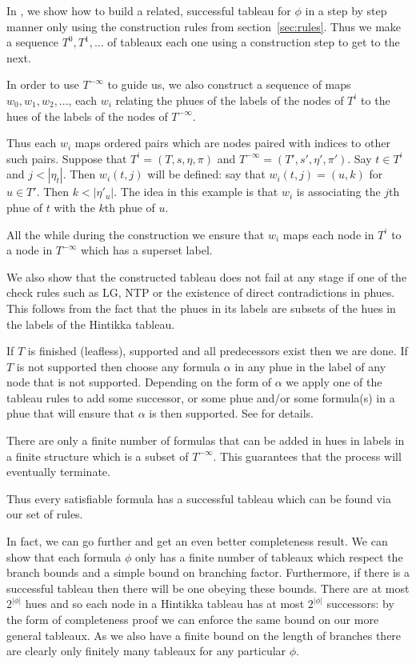 \documentclass[submission,copyright,creativecommons]{eptcs}
\begin{document}
In \cite{Rey:fasttablong}, we show how to build a related, successful tableau
for $\phi$
in a step by step manner
only using the 
construction rules from section~\ref{sec:rules}.
Thus we make a sequence
$T^0, T^1, ...$ of tableaux 
each one using a construction step to get to the next.

In order to use $T^{- \infty}$ to guide us,
we also construct
a sequence of maps
$w_0, w_1, w_2, ...$,
each $w_i$ relating the 
phues of the labels of the nodes of $T^i$ to the hues of the 
labels of the nodes
of $T^{- \infty}$.

Thus each $w_i$ maps ordered pairs which are
nodes paired with indices
to other such pairs.
Suppose that $T^i=(T,s,\eta,\pi)$
and $T^{-\infty}=(T',s',\eta',\pi')$.
Say $t \in T^i$ and 
$j < |\eta_t|$.
Then $w_i(t,j)$ will be defined: say that
$w_i(t,j)=(u,k)$ for $u \in T'$.
Then $k<|\eta'_u|$.
The idea in this example is that $w_i$ is associating the $j$th phue
of $t$ with the $k$th phue of $u$.

All the while during the
construction
we ensure that 
 $w_i$ maps 
each node in $T^i$ to a node in $T^{-\infty}$
which has a superset label.

We also show that the constructed tableau 
does not fail at any stage if one of the check rules
such as LG, NTP or the
existence of direct contradictions in phues.
This follows from the fact that the
phues in its labels are subsets 
of the hues in the
labels of the Hintikka tableau.

If $T$ is finished (leafless), supported and 
all predecessors exist then we are done.
If $T$ is not supported then choose any
formula $\alpha$ in any phue in the label
of any node that is not supported.
Depending on the form of $\alpha$
we apply one of the tableau rules
to add some successor,
or some phue
and/or some formula(s)
in a phue that will ensure that
$\alpha$ is then supported.
See \cite{Rey:fasttablong} for details.

There are only a finite number of 
formulas that can be added in hues in labels in a finite structure which is a subset of 
$T^{-\infty}$.
This guarantees
that the process will eventually terminate.

Thus every satisfiable formula
has a successful tableau
which can be found via our set
of rules.

In fact, we can go further and get an
even better completeness result.
We can show that each formula
$\phi$ only has a
finite number of tableaux
which respect the branch bounds
and a simple bound on branching factor.
Furthermore, if there is a successful
tableau then there will be one
obeying these bounds.
There are at most $2^{|\phi|}$ hues
and so each node
in a Hintikka tableau has at most
$2^{|\phi|}$ successors:
by the form of completeness proof we can
enforce the same bound on our
more general tableaux.
As we also have a finite bound on the length
of branches
there are clearly only finitely many
tableaux for any particular
$\phi$.
\end{document}
